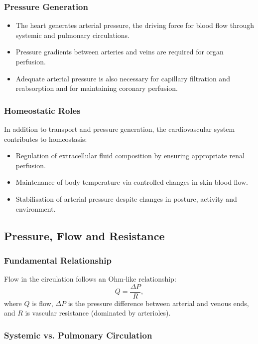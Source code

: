 \documentclass[11pt,a4paper]{article}
\begin{document}
\subsubsection{Pressure Generation}

\begin{itemize}
  \item The heart generates arterial pressure, the driving force for blood flow through systemic and pulmonary circulations.
  \item Pressure gradients between arteries and veins are required for organ perfusion.
  \item Adequate arterial pressure is also necessary for capillary filtration and reabsorption and for maintaining coronary perfusion.
\end{itemize}

\subsubsection{Homeostatic Roles}

In addition to transport and pressure generation, the cardiovascular system contributes to homeostasis:
\begin{itemize}
  \item Regulation of extracellular fluid composition by ensuring appropriate renal perfusion.
  \item Maintenance of body temperature via controlled changes in skin blood flow.
  \item Stabilisation of arterial pressure despite changes in posture, activity and environment.
\end{itemize}

\subsection{Pressure, Flow and Resistance}

\subsubsection{Fundamental Relationship}

Flow in the circulation follows an Ohm-like relationship:
\[
Q = \frac{\Delta P}{R},
\]
where $Q$ is flow, $\Delta P$ is the pressure difference between arterial and venous ends, and $R$ is vascular resistance (dominated by arterioles).

\subsubsection{Systemic vs. Pulmonary Circulation}
\end{document}
